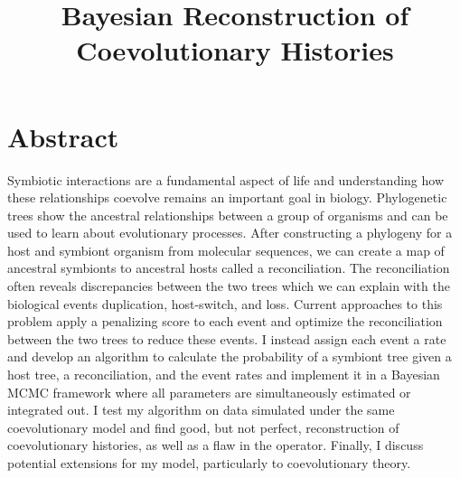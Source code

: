 \documentclass[12pt,letterpaper]{article}
\title{Bayesian Reconstruction of Coevolutionary Histories}
\begin{document}
\maketitle
\thispagestyle{empty}

\doublespacing

\section*{Abstract}

Symbiotic interactions are a fundamental aspect of life and understanding how these relationships coevolve remains an important goal in biology. Phylogenetic trees show the ancestral relationships between a group of organisms and can be used to learn about evolutionary processes. After constructing a phylogeny for a host and symbiont organism from molecular sequences, we can create a map of ancestral symbionts to ancestral hosts called a reconciliation. The reconciliation often reveals discrepancies between the two trees which we can explain with the biological events duplication, host-switch, and loss. Current approaches to this problem apply a penalizing score to each event and optimize the reconciliation between the two trees to reduce these events. I instead assign each event a rate and develop an algorithm to calculate the probability of a symbiont tree given a host tree, a reconciliation, and the event rates and implement it in a Bayesian MCMC framework where all parameters are simultaneously estimated or integrated out. I test my algorithm on data simulated under the same coevolutionary model and find good, but not perfect, reconstruction of coevolutionary histories, as well as a flaw in the operator. Finally, I discuss potential extensions for my model, particularly to coevolutionary theory.
\end{document}
